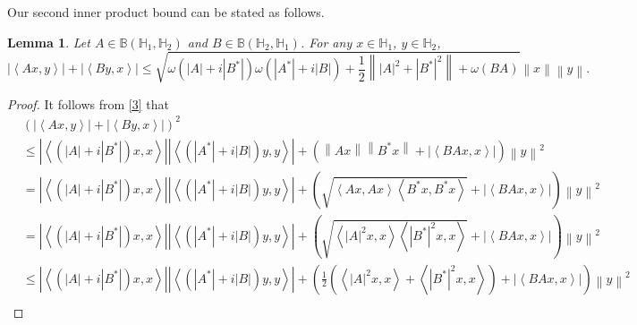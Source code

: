 \documentclass[12pt,twoside,reqno]{amsart}
\newtheorem{lemma}{Lemma}[section]
\numberwithin{equation}{section}
\begin{document}
Our second inner product bound can be stated as follows.

\begin{lemma}\label{4}
Let $A\in \mathbb B\left( {{\mathbb H}_{1}},{{\mathbb H}_{2}} \right)$ and $B\in \mathbb B\left( {{\mathbb H}_{2}},{{\mathbb H}_{1}} \right)$. For any $x\in {{\mathbb H}_{1}} $, $y\in {{\mathbb H}_{2}}$, 
\[\left| \left\langle Ax,y \right\rangle  \right|+\left| \left\langle By,x \right\rangle  \right|\le \sqrt{\omega \left( \left| A \right|+i\left| {{B}^{*}} \right| \right)\omega \left( \left| {{A}^{*}} \right|+i\left| B \right| \right)+\frac{1}{2}\left\| {{\left| A \right|}^{2}}+{{\left| {{B}^{*}} \right|}^{2}} \right\|+\omega \left( BA \right)}\left\| x \right\|\left\| y \right\|.\]
\end{lemma}
\begin{proof}
It follows from \eqref{3} that
\[\begin{aligned}
  & {{\left( \left| \left\langle Ax,y \right\rangle  \right|+\left| \left\langle By,x \right\rangle  \right| \right)}^{2}} \\ 
 & \le \left| \left\langle \left( \left| A \right|+i\left| {{B}^{*}} \right| \right)x,x \right\rangle  \right|\left| \left\langle \left( \left| {{A}^{*}} \right|+i\left| B \right| \right)y,y \right\rangle  \right|+\left( \left\| Ax \right\|\left\| {{B}^{*}}x \right\|+\left| \left\langle BAx,x \right\rangle  \right| \right){{\left\| y \right\|}^{2}} \\ 
 & =\left| \left\langle \left( \left| A \right|+i\left| {{B}^{*}} \right| \right)x,x \right\rangle  \right|\left| \left\langle \left( \left| {{A}^{*}} \right|+i\left| B \right| \right)y,y \right\rangle  \right|+\left( \sqrt{\left\langle Ax,Ax \right\rangle \left\langle {{B}^{*}}x,{{B}^{*}}x \right\rangle }+\left| \left\langle BAx,x \right\rangle  \right| \right){{\left\| y \right\|}^{2}} \\ 
 & =\left| \left\langle \left( \left| A \right|+i\left| {{B}^{*}} \right| \right)x,x \right\rangle  \right|\left| \left\langle \left( \left| {{A}^{*}} \right|+i\left| B \right| \right)y,y \right\rangle  \right|+\left( \sqrt{\left\langle {{\left| A \right|}^{2}}x,x \right\rangle \left\langle {{\left| {{B}^{*}} \right|}^{2}}x,x \right\rangle }+\left| \left\langle BAx,x \right\rangle  \right| \right){{\left\| y \right\|}^{2}} \\ 
 & \le \left| \left\langle \left( \left| A \right|+i\left| {{B}^{*}} \right| \right)x,x \right\rangle  \right|\left| \left\langle \left( \left| {{A}^{*}} \right|+i\left| B \right| \right)y,y \right\rangle  \right|+\left( \frac{1}{2}\left( \left\langle {{\left| A \right|}^{2}}x,x \right\rangle +\left\langle {{\left| {{B}^{*}} \right|}^{2}}x,x \right\rangle  \right)+\left| \left\langle BAx,x \right\rangle  \right| \right){{\left\| y \right\|}^{2}} \\ 

\end{aligned}\]
\end{proof}
\end{document}
